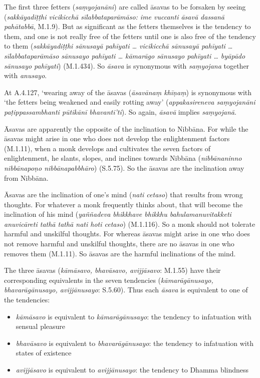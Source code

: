 The first three fetters (\textit{saṃyojanāni}) are called āsavas to be forsaken by seeing (\textit{sakkāyadiṭṭhi vicikicchā sīlabbataparāmāso: ime vuccanti āsavā dassanā pahātabbā}, M.1.9). But as significant as the fetters themselves is the tendency to them, and one is not really free of the fetters until one is also free of the tendency to them (\textit{sakkāyadiṭṭhi sānusayā pahīyati \ldots{} vicikicchā sānusayā pahīyati \ldots{} sīlabbataparāmāso sānusayo pahīyati \ldots{} kāmarāgo sānusayo pahīyati \ldots{} byāpādo sānusayo pahīyati}) (M.1.434). So \textit{āsava} is synonymous with \textit{saṃyojana} together with \textit{anusayo}.

At A.4.127, `wearing away of the āsavas (\textit{āsavānaṃ khīṇaṃ}) is synonymous with `the fetters being weakened and easily rotting away' (\textit{appakasireneva saṃyojanāni paṭippassambhanti pūtikānī bhavantī'ti}). So again, \textit{āsavā} implies \textit{saṃyojanā}.

Āsavas are apparently the opposite of the inclination to Nibbāna. For while the āsavas might arise in one who does not develop the enlightenment factors (M.1.11), when a monk develops and cultivates the seven factors of enlightenment, he slants, slopes, and inclines towards Nibbāna (\textit{nibbānaninno nibbānapoṇo nibbānapabbhāro}) (S.5.75). So the āsavas are the inclination away from Nibbāna.

Āsavas are the inclination of one's mind (\textit{nati cetaso}) that results from wrong thoughts. For whatever a monk frequently thinks about, that will become the inclination of his mind (\textit{yaññadeva bhikkhave bhikkhu bahulamanuvitakketi anuvicāreti tathā tathā nati hoti cetaso}) (M.1.116). So a monk should not tolerate harmful and unskilful thoughts. For whereas āsavas might arise in one who does not remove harmful and unskilful thoughts, there are no āsavas in one who removes them (M.1.11). So āsavas are the harmful inclinations of the mind.

The three āsavas (\textit{kāmāsavo, bhavāsavo, avijjāsavo}: M.1.55) have their corresponding equivalents in the seven tendencies (\textit{kāmarāgānusayo, bhavarāgānusayo, avijjānusayo}: S.5.60). Thus each \textit{āsava} is equivalent to one of the tendencies:

\begin{itemize}
\item \textit{kāmāsavo} is equivalent to \textit{kāmarāgānusayo}: the tendency to infatuation with sensual pleasure
\item \textit{bhavāsavo} is equivalent to \textit{bhavarāgānusayo}: the tendency to infatuation with states of existence
\item \textit{avijjāsavo} is equivalent to \textit{avijjānusayo}: the tendency to Dhamma blindness
\end{itemize}

